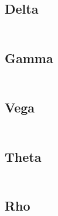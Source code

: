 \documentclass[12pt,a4paper]{article}
\begin{document}
\subsection{Delta}
\[
  \begin{aligned}
  \end{aligned}
\]

\subsection{Gamma}
\[
  \begin{aligned}
  \end{aligned}
\]

\subsection{Vega}
\[
  \begin{aligned}
  \end{aligned}
\]

\subsection{Theta}
\[
  \begin{aligned}
  \end{aligned}
\]

\subsection{Rho}
\[
  \begin{aligned}
  \end{aligned}
\]
\end{document}
